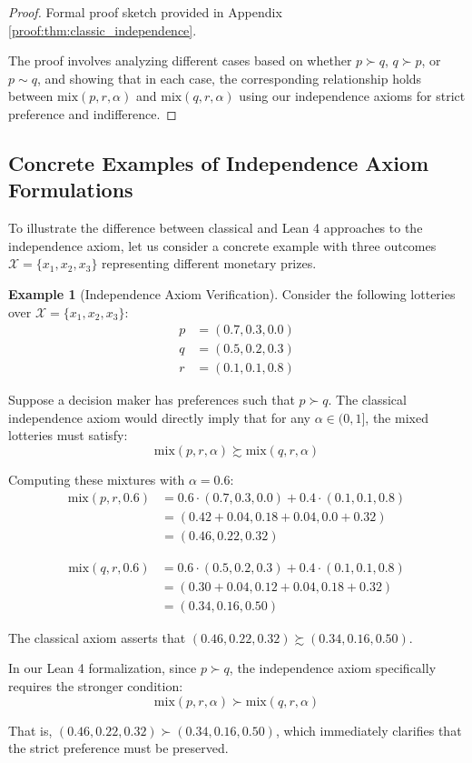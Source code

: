 \documentclass{article}
\theoremstyle{definition}
\newtheorem{example}{Example}[section]
\newcommand{\X}{\mathcal{X}}
\newcommand{\pref}{\succsim} %
\newcommand{\strictpref}{\succ} %
\newcommand{\indiff}{\sim} %
\newcommand{\mix}{\mathrm{mix}} %
\begin{document}
\begin{proof}
Formal proof sketch provided in Appendix \ref{proof:thm:classic_independence}.

The proof involves analyzing different cases based on whether $p \strictpref q$, $q \strictpref p$, or $p \indiff q$, and showing that in each case, the corresponding relationship holds between $\mix(p, r, \alpha)$ and $\mix(q, r, \alpha)$ using our independence axioms for strict preference and indifference.
\end{proof}

\subsection{Concrete Examples of Independence Axiom Formulations}

To illustrate the difference between classical and Lean 4 approaches to the independence axiom, let us consider a concrete example with three outcomes $\X = \{x_1, x_2, x_3\}$ representing different monetary prizes.

\begin{example}[Independence Axiom Verification]
Consider the following lotteries over $\X = \{x_1, x_2, x_3\}$:
\begin{align*}
p &= (0.7, 0.3, 0.0) \\
q &= (0.5, 0.2, 0.3) \\
r &= (0.1, 0.1, 0.8)
\end{align*}

Suppose a decision maker has preferences such that $p \strictpref q$. The classical independence axiom would directly imply that for any $\alpha \in (0,1]$, the mixed lotteries must satisfy:
\[ \mix(p, r, \alpha) \pref \mix(q, r, \alpha) \]

Computing these mixtures with $\alpha = 0.6$:
\begin{align*}
\mix(p, r, 0.6) &= 0.6 \cdot (0.7, 0.3, 0.0) + 0.4 \cdot (0.1, 0.1, 0.8) \\
&= (0.42 + 0.04, 0.18 + 0.04, 0.0 + 0.32) \\
&= (0.46, 0.22, 0.32)
\end{align*}

\begin{align*}
\mix(q, r, 0.6) &= 0.6 \cdot (0.5, 0.2, 0.3) + 0.4 \cdot (0.1, 0.1, 0.8) \\
&= (0.30 + 0.04, 0.12 + 0.04, 0.18 + 0.32) \\
&= (0.34, 0.16, 0.50)
\end{align*}

The classical axiom asserts that $(0.46, 0.22, 0.32) \pref (0.34, 0.16, 0.50)$.

In our Lean 4 formalization, since $p \strictpref q$, the independence axiom specifically requires the stronger condition:
\[ \mix(p, r, \alpha) \strictpref \mix(q, r, \alpha) \]

That is, $(0.46, 0.22, 0.32) \strictpref (0.34, 0.16, 0.50)$, which immediately clarifies that the strict preference must be preserved.
\end{example}
\end{document}
